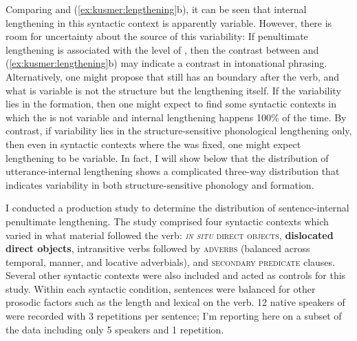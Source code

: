 \documentclass[output=paper,modfonts,nonflat,draftmode]{langsci/langscibook}
\begin{document}
Comparing  and
(\ref{ex:kusmer:lengthening}b), it can be seen that internal lengthening in
this syntactic context is apparently variable.  However, there is room for
uncertainty about the source of this variability: If penultimate lengthening is
associated with the  level of , then the
contrast between  and (\ref{ex:kusmer:lengthening}b)
may indicate a contrast in intonational phrasing.  Alternatively, one might
propose that  still has an  boundary
after the verb, and what is variable is not the structure but the lengthening
itself. If the variability lies in the  formation, then one
might expect to find some syntactic contexts in which the  is
not variable and internal lengthening happens 100\% of the time. By contrast,
if variability lies in the structure-sensitive phonological lengthening only,
then even in syntactic contexts where the  was fixed, one
might expect lengthening to be variable. In fact, I will show below that the
distribution of utterance-internal lengthening shows a complicated three-way
distribution that indicates variability in both structure-sensitive phonology
and  formation.

I conducted a production study to determine the distribution of
sentence-in\-ter\-nal penultimate lengthening. The study comprised four syntactic
contexts which varied in what material followed the verb: \textsc{\textit{in
situ} direct objects}, \textbf{dislocated direct objects}, intransitive verbs
followed by \textsc{adverbs} (balanced across temporal, manner, and locative
adverbials), and \textsc{secondary predicate} clauses. Several other syntactic
contexts were also included and acted as controls for this study.  Within each
syntactic condition, sentences were balanced for other prosodic factors such as
the length and lexical  on the verb. 12 native speakers of  were
recorded with 3 repetitions per sentence; I'm reporting here on a subset of the
data including only 5 speakers and 1 repetition.

\end{document}
